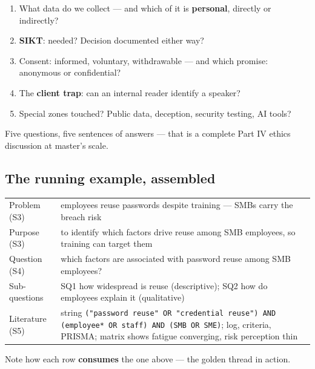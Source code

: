 \documentclass[11pt,a4paper,british,twoside=false,headings=small,chapterprefix=false,numbers=noenddot]{scrbook}
\begin{document}
\begin{center}\small
\small
  \begin{enumerate}\setlength{\itemsep}{0.45em}
    \item What data do we collect --- and which of it is \textbf{personal},
          directly or indirectly?
    \item \textbf{SIKT}: needed? Decision documented either way?
    \item Consent: informed, voluntary, withdrawable --- and which promise:
          anonymous or confidential?
    \item The \textbf{client trap}: can an internal reader identify a
          speaker?
    \item Special zones touched? Public data, deception, security testing,
          AI tools?
  \end{enumerate}
  
  Five questions, five sentences of answers --- that is a complete Part IV
  ethics discussion at master's scale.
\end{center}


\subsection{The running example, assembled}
\begin{center}\small
\footnotesize
  \renewcommand{\arraystretch}{1.3}
  \begin{tabular}{@{}p{3.2cm}p{10.2cm}@{}}
    \toprule
    Problem (S3) & employees reuse passwords despite training --- SMBs carry the breach risk\\
    Purpose (S3) & to identify which factors drive reuse among SMB employees, so training can target them\\
    Question (S4) & which factors are associated with password reuse among SMB employees?\\
    Sub-questions & SQ1 how widespread is reuse (descriptive); SQ2 how do employees explain it (qualitative)\\
    Literature (S5) & string \texttt{("password reuse" OR "credential reuse") AND (employee* OR staff) AND (SMB OR SME)}; log, criteria, PRISMA; matrix shows fatigue converging, risk perception thin\\
    \bottomrule
  \end{tabular}
  

  Note how each row \textbf{consumes} the one above --- the golden thread in
  action.
\end{center}
\end{document}
